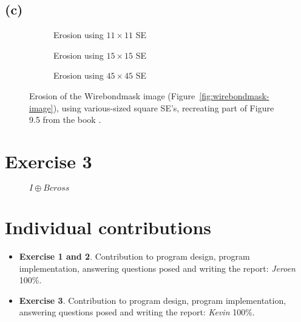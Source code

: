 \documentclass{article}
\begin{document}
\subsection*{(c)}
\begin{figure}[H]
     \centering
     \begin{subfigure}[b]{0.3\textwidth}
         \centering
         
         \caption{Erosion using $11 \times 11$ SE}
         \label{fig:book9.5figure-wirebondmask-image-11x11}
     \end{subfigure}
     \hfill
     \begin{subfigure}[b]{0.3\textwidth}
         \centering
         
         \caption{Erosion using $15 \times 15$ SE}
         \label{fig:book9.5figure-wirebondmask-image-15x15}
     \end{subfigure}
     \hfill
     \begin{subfigure}[b]{0.3\textwidth}
         \centering
         
         \caption{Erosion using $45 \times 45$ SE}
         \label{fig:book9.5figure-wirebondmask-image-45x45}
     \end{subfigure}
     
    \caption{Erosion of the Wirebondmask image (Figure~\ref{fig:wirebondmask-image}), using various-sized square SE's, recreating part of Figure 9.5 from the book \citep{gonzalez2008digital}.}
    \label{fig:book9.5figure}
\end{figure}

\section*{Exercise 3}



\begin{figure}[H]
    \centering
    
    \caption{$I \oplus Bcross$}
    \label{fig:skeleton_test}
\end{figure}

\section*{Individual contributions}
\begin{itemize}
    \item \textbf{Exercise 1 and 2}. Contribution to program design, program implementation, answering questions posed and writing the report: \textit{Jeroen} 100\%.
    \item \textbf{Exercise 3}. Contribution to program design, program implementation, answering questions posed and writing the report: \textit{Kevin} 100\%.
\end{itemize}
\end{document}
